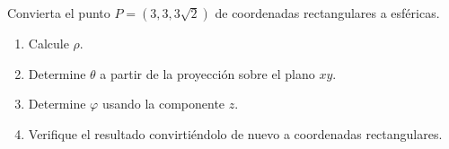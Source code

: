 Convierta el punto $P=(3,3,3\sqrt{2})$ de coordenadas rectangulares a esféricas.
\begin{enumerate}
    \item Calcule $\rho$.
    \item Determine $\theta$ a partir de la proyección sobre el plano $xy$.
    \item Determine $\varphi$ usando la componente $z$.
    \item Verifique el resultado convirtiéndolo de nuevo a coordenadas rectangulares.
\end{enumerate}
